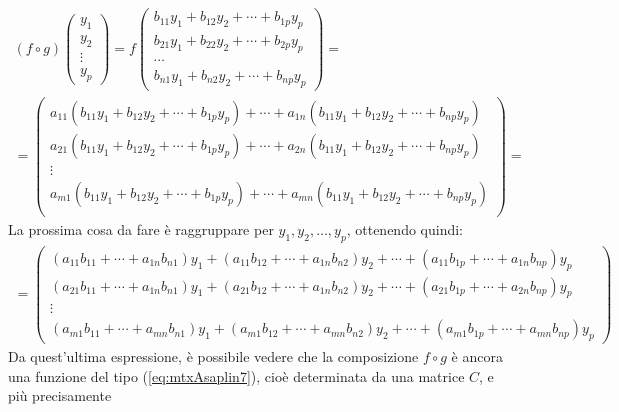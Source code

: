 \begin{equation}
  \label{eq:Compinveeproddimatrici3}
  \begin{matrix}
    (f\circ g)
    \begin{pmatrix}
      y_1\\
      y_2\\
      \vdots\\
      y_p
    \end{pmatrix}=f
    \begin{pmatrix}
      b_{11}y_1+b_{12}y_2+\cdots+b_{1p}y_p\\
      b_{21}y_1+b_{22}y_2+\cdots+b_{2p}y_p\\
      \cdots\\
      b_{n1}y_1+b_{n2}y_2+\cdots+b_{np}y_p
    \end{pmatrix}=\\
    =\begin{pmatrix}
      a_{11}(b_{11}y_1+b_{12}y_2+\cdots+b_{1p}y_p)+\cdots+a_{1n}(b_{11}y_1+b_{12}y_2+\cdots+b_{np}y_p)\\
      a_{21}(b_{11}y_1+b_{12}y_2+\cdots+b_{1p}y_p)+\cdots+a_{2n}(b_{11}y_1+b_{12}y_2+\cdots+b_{np}y_p)\\
      \vdots\\
      a_{m1}(b_{11}y_1+b_{12}y_2+\cdots+b_{1p}y_p)+\cdots+a_{mn}(b_{11}y_1+b_{12}y_2+\cdots+b_{np}y_p)\\
    \end{pmatrix}=
  \end{matrix}
\end{equation}
La prossima cosa da fare è raggruppare per $y_1,y_2,\dots,y_p$, ottenendo quindi:
\begin{eqnarray*}
  =\begin{pmatrix}
    (a_{11}b_{11}+\cdots+a_{1n}b_{n1})y_1+(a_{11}b_{12}+\cdots+a_{1n}b_{n2})y_2
    +\cdots+(a_{11}b_{1p}+\cdots+a_{1n}b_{np})y_p\\
    (a_{21}b_{11}+\cdots+a_{1n}b_{n1})y_1+(a_{21}b_{12}+\cdots+a_{1n}b_{n2})y_2
    +\cdots+(a_{21}b_{1p}+\cdots+a_{2n}b_{np})y_p\\
    \vdots\\
    (a_{m1}b_{11}+\cdots+a_{mn}b_{n1})y_1+(a_{m1}b_{12}+\cdots+a_{mn}b_{n2})y_2
    +\cdots+(a_{m1}b_{1p}+\cdots+a_{mn}b_{np})y_p
  \end{pmatrix}
\end{eqnarray*}
Da quest'ultima espressione, è possibile vedere che la composizione $f\circ g$ è ancora una funzione
del tipo (\ref{eq:mtxAsaplin7}), cioè determinata da una matrice $C$, e più precisamente
